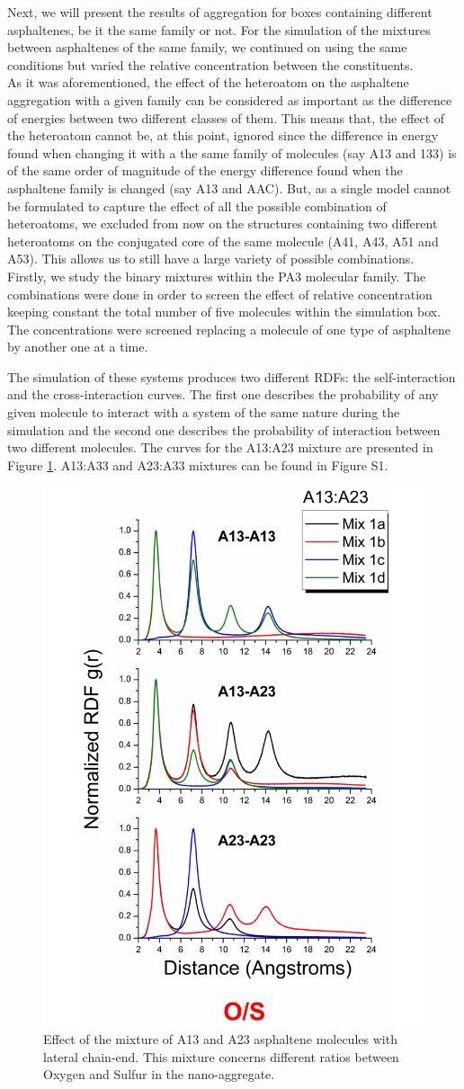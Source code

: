 Next, we will present the results of aggregation for boxes containing different asphaltenes, be it the same family or not. For the simulation of the mixtures between asphaltenes of the same family, we continued on using the same conditions but varied the relative concentration between the constituents.\\

As it was aforementioned, the effect of the heteroatom on the asphaltene aggregation with a given family can be considered as important as the difference of energies between two different classes of them. This means that, the effect of the heteroatom cannot be, at this point, ignored since the difference in energy found when changing it with a the same family of molecules (say A13 and 133) is of the same order of magnitude of the energy difference found when the asphaltene family is changed (say A13 and AAC). But, as a single model cannot be formulated to capture the effect of all the possible combination of heteroatoms, we excluded from now on the structures containing two different heteroatoms on the conjugated core of the same molecule (A41, A43, A51 and A53). This allows us to still have a large variety of possible combinations.\\

Firstly, we study the binary mixtures within the PA3 molecular family. The combinations were done in order to screen the effect of relative concentration keeping constant the total number of five molecules within the simulation box. The concentrations were screened replacing a molecule of one type of asphaltene by another one at a time.

The simulation of these systems produces two different RDFs: the self-interaction and the cross-interaction curves. The first one describes the probability of any given molecule to interact with a system of the same nature during the simulation and the second one describes the probability of interaction between two different molecules. The curves for the A13:A23 mixture are presented in Figure \ref{pap:fig22}. A13:A33 and A23:A33 mixtures can be found in Figure S1. 

\begin{figure}[htb]
	\centering
	\includegraphics[width=0.4\columnwidth]{image/06a} 
	\caption{Effect of the mixture of A13 and A23 asphaltene molecules with  lateral chain-end. This mixture concerns different ratios between Oxygen and Sulfur in the nano-aggregate.}
	\label{pap:fig22}
\end{figure}

